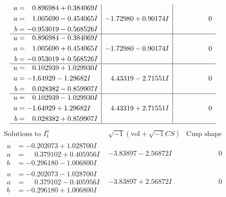 \documentclass[1p]{elsarticle_modified}
\theoremstyle{definition}
\newcommand{\I}{\sqrt{-1}}
\begin{document}
$$\begin{array}{c|c|c}
\begin{aligned}
u &= \phantom{-}0.896984 + 0.384069 I \\
a &= \phantom{-}1.005690 - 0.454065 I \\
b &= -0.953019 - 0.568526 I\end{aligned}
 & -1.72980 + 0.90174 I & \phantom{-0.000000 } 0 \\ \hline\begin{aligned}
u &= \phantom{-}0.896984 - 0.384069 I \\
a &= \phantom{-}1.005690 + 0.454065 I \\
b &= -0.953019 + 0.568526 I\end{aligned}
 & -1.72980 - 0.90174 I & \phantom{-0.000000 } 0 \\ \hline\begin{aligned}
u &= \phantom{-}0.102939 + 1.029930 I \\
a &= -1.64929 - 1.29682 I \\
b &= \phantom{-}0.028382 - 0.859907 I\end{aligned}
 & \phantom{-}4.43319 - 2.71551 I & \phantom{-0.000000 } 0 \\ \hline\begin{aligned}
u &= \phantom{-}0.102939 - 1.029930 I \\
a &= -1.64929 + 1.29682 I \\
b &= \phantom{-}0.028382 + 0.859907 I\end{aligned}
 & \phantom{-}4.43319 + 2.71551 I & \phantom{-0.000000 } 0\\
 \hline 
 \end{array}$$\newpage$$\begin{array}{c|c|c}  
\text{Solutions to }I^u_{1}& \I (\text{vol} + \sqrt{-1}CS) & \text{Cusp shape}\\
 \hline 
\begin{aligned}
u &= -0.202073 + 1.028700 I \\
a &= \phantom{-}0.379102 + 0.405956 I \\
b &= -0.296180 - 1.006800 I\end{aligned}
 & -3.83897 - 2.56872 I & \phantom{-0.000000 } 0 \\ \hline\begin{aligned}
u &= -0.202073 - 1.028700 I \\
a &= \phantom{-}0.379102 - 0.405956 I \\
b &= -0.296180 + 1.006800 I\end{aligned}
 & -3.83897 + 2.56872 I & \phantom{-0.000000 } 0 \\ \hline\begin{aligned}

\end{aligned}
\end{array}$$
\end{document}
